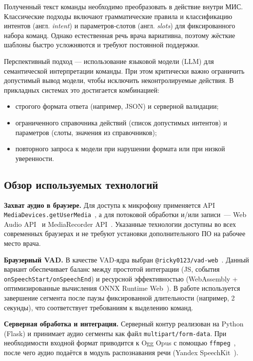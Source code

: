 Полученный текст команды необходимо преобразовать в действие внутри МИС.
Классические подходы включают грамматические правила и классификацию интентов (англ. \textit{intent}) и параметров‑слотов (англ. \textit{slots}) для фиксированного набора команд.
Однако естественная речь врача вариативна, поэтому жёсткие шаблоны быстро усложняются и требуют постоянной поддержки.

Перспективный подход --- использование языковой модели (LLM) для семантической интерпретации команды.
При этом критически важно ограничить допустимый вывод модели, чтобы исключить неконтролируемые действия.
В прикладных системах это достигается комбинацией:
\begin{itemize}
    \item строгого формата ответа (например, JSON) и серверной валидации;
    \item ограниченного справочника действий (список допустимых интентов) и параметров (слоты, значения из справочников);
    \item повторного запроса к модели при нарушении формата или при низкой уверенности.
\end{itemize}

\subsection{Обзор используемых технологий}
\label{subsec:rw_tech}

\textbf{Захват аудио в браузере.}
Для доступа к микрофону применяется API \texttt{MediaDevices.getUserMedia}~\cite{MDNGetUserMedia}, а для потоковой обработки и/или записи~--- Web Audio API~\cite{WebAudioAPI} и MediaRecorder API~\cite{MDNMediaRecorder}.
Указанные технологии доступны во всех современных браузерах и не требуют установки дополнительного ПО на рабочее место врача.

\textbf{Браузерный VAD.}
В качестве VAD‑ядра выбран \texttt{@ricky0123/vad-web}~\cite{RickyVADWebDocs}.
Данный вариант обеспечивает баланс между простотой интеграции (JS, события \texttt{onSpeechStart/onSpeechEnd}) и ресурсной эффективностью (WebAssembly + оптимизированные вычисления ONNX Runtime Web~\cite{ONNXRuntimeWeb}).
В работе используется завершение сегмента после паузы фиксированной длительности (например, 2 секунды), что соответствует требованиям к выделению команд.

\textbf{Серверная обработка и интеграция.}
Серверный контур реализован на Python (Flask) и принимает аудио сегменты как файл \texttt{multipart/form-data}.
При необходимости входной формат приводится к Ogg Opus с помощью \texttt{ffmpeg}~\cite{FFmpeg}, после чего аудио подаётся в модуль распознавания речи (Yandex SpeechKit~\cite{YandexSpeechKit}).


